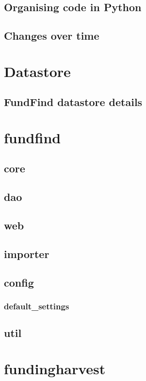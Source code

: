 \subsection{Organising code in Python}
\subsection{Changes over time}
\section{Datastore}
\subsection{FundFind datastore details}
\section{fundfind}
\subsection{core}
\subsection{dao}
\subsection{web}
\subsection{importer}
\subsection{config}
\subsubsection{default\_settings}
\subsection{util}
\section{fundingharvest}
